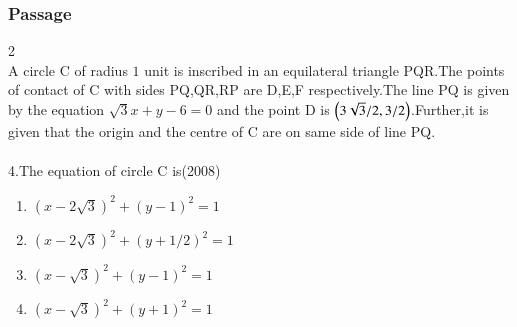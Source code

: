 \documentclass[journal,12pt,twocolumn]{IEEEtran}
\theoremstyle{remark}
\begin{document}
\subsubsection{Passage } 2\\
A circle C of radius $1$ unit is inscribed in an equilateral triangle PQR.The points of contact of C with sides PQ,QR,RP are D,E,F respectively.The line PQ is given by the equation $\sqrt{3}x+y-6=0$ and the point D is $\left(3\sqrt{3}/2 , 3/2\right)$.Further,it is given that the origin and the centre of C are on same side of line PQ.\\
\\
4.The equation of circle C is\hfill{(2008)}
\begin{enumerate}
\item $(x-2\sqrt{3})^2 + (y-1)^2=1$\\
\item $(x-2\sqrt{3})^2 + (y+1/2)^2=1$\\
\item $(x-\sqrt{3})^2 + (y-1)^2=1$\\
\item $(x-\sqrt{3})^2 + (y+1)^2=1$\\
\end{enumerate}
\end{document}
